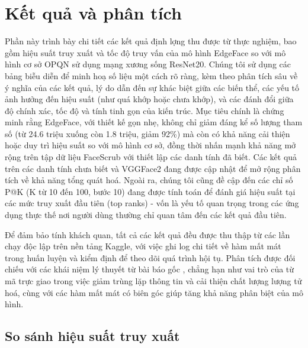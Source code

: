 \section {Kết quả và phân tích}
Phần này trình bày chi tiết các kết quả định lợng thu được từ thực nghiệm, bao gồm hiệu suất truy xuất và tốc độ truy vấn của mô hình EdgeFace so với mô hình cơ sở OPQN sử dụng mạng xương sống ResNet20. Chúng tôi sử dụng các bảng biễu diễn để minh hoạ số liệu một cách rõ ràng, kèm theo phân tích sâu về ý nghĩa của các kết quả, lý do dẫn đến sự khác biệt giữa các biến thể, các yếu tố ảnh hưởng đến hiệu suất (như quá khớp hoặc chưa khớp), và các đánh đổi giữa độ chính xác, tốc độ và tính tinh gọn của kiến trúc. Mục tiêu chính là chứng minh rằng EdgeFace, với thiết kế gọn nhẹ, không chỉ giảm đáng kể số lượng tham số (từ 24.6 triệu xuống còn 1.8 triệu, giảm 92\%) mà còn có khả năng cải thiện hoặc duy trì hiệu suất so với mô hình cơ sở, đồng thời nhấn mạnh khả năng mở rộng trên tập dữ liệu FaceScrub với thiết lập các danh tính đã biết. Các kết quả trên các danh tính chưa biết và VGGFace2 đang được cập nhật để mở rộng phân tích về khả năng tổng quát hoá. Ngoài ra, chúng tôi cũng đề cập đến các chỉ số P@K (K từ 10 đến 100, bước 10) đang được tính toán để đánh giá hiệu suất tại các mức truy xuất đầu tiên (top ranks) - vốn là yếu tố quan trọng trong các ứng dụng thực thế nơi người dùng thường chỉ quan tâm đến các kết quả đầu tiên. 

Để đảm bảo tính khách quan, tất cả các kết quả đều được thu thập từ các lần chạy độc lập trên nền tảng Kaggle, với việc ghi log chi tiết về hàm mất mát trong huấn luyện và kiểm định để theo dõi quá trình hội tụ. Phân tích được đối chiếu với các khái niệm lý thuyết từ bài báo gốc \cite{opqn}, chẳng hạn như vai trò của từ mã trực giao trong việc giảm trùng lặp thông tin và cải thiện chất lượng lượng tử hoá, cùng với các hàm mất mát có biên góc giúp tăng khả năng phân biệt của mô hình.

\subsection {So sánh hiệu suất truy xuất}

